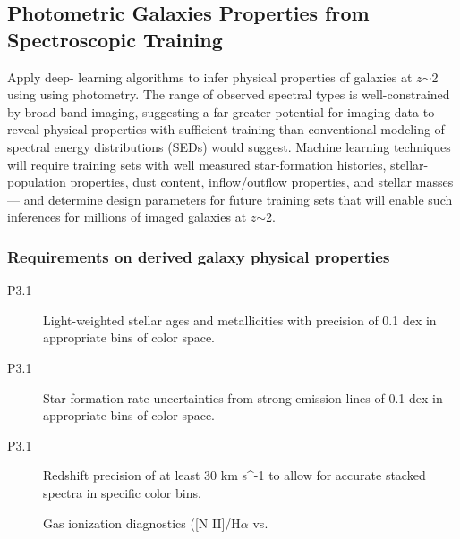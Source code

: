 \documentclass[preprint,11pt]{aastex}
\newcommand{\kms}{{\rm km s^{-1}}}
\begin{document}
\subsection{Photometric Galaxies Properties from Spectroscopic Training}
\label{sec:cosmology}

Apply deep-
learning algorithms to infer physical properties of galaxies at
$z$$\sim$2 using using photometry. The range of observed spectral
types is well-constrained by broad-band imaging,
suggesting a far greater potential for imaging data to reveal physical
properties with sufficient training than conventional modeling of
spectral energy distributions (SEDs) would suggest.  Machine
learning techniques will require training sets with well measured star-formation histories,
stellar-population properties, dust content, inflow/outflow properties,
and stellar masses --- and determine design parameters for future training sets that will enable such inferences for millions of imaged galaxies at $z$$\sim$2.

\subsubsection{Requirements on derived galaxy physical properties}

\begin{description}

\item[P3.1] Light-weighted stellar ages and metallicities with precision of 0.1 dex in appropriate bins of color space.

\item[P3.1] Star formation rate uncertainties from strong emission lines of 0.1 dex in appropriate bins of color space.

\item[P3.1] Redshift precision of at least 30 \kms{} to allow for accurate stacked spectra in specific color bins.


Gas ionization diagnostics ([N II]/H$\alpha$ vs.\ 


\end{description}


\end{document}
